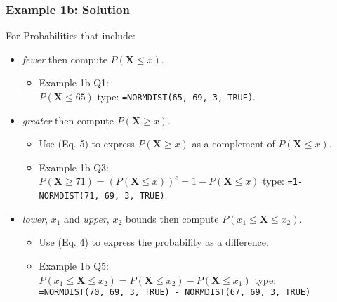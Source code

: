 \documentclass[12pt]{beamer}
\begin{document}
  	\begin{frame}
  		\frametitle{Example 1b: Solution}
  		For Probabilities that include:
  		\begin{itemize}
  			\item \textit{fewer} then compute $P(\textbf{X} \leq x)$.
  				\begin{itemize}
  					\item Example 1b Q1:\\ $P(\textbf{X} \leq 65) $ type: \texttt{=NORMDIST(65, 69, 3, TRUE)}.
  				\end{itemize} 
  			\item \textit{greater} then compute $P(\textbf{X} \geq x)$.  
  			\begin{itemize}
  				\item Use (Eq. 5) to express $P(\textbf{X} \geq x)$ as a complement of $P(\textbf{X}\leq x)$.
  				\item Example 1b Q3: \\$P( \textbf{X} \geq 71) = (P(\textbf{X} \leq x))^c = 1 - P(\textbf{X} \leq x) $ type: \texttt{=1-NORMDIST(71, 69, 3, TRUE)}.
  			\end{itemize}
  		
  			\item \textit{lower}, $x_1$ and  \textit{upper}, $x_2$ bounds then compute $P(x_1 \leq \textbf{X} \leq x_2)$.
  			\begin{itemize}
  				\item Use (Eq. 4) to express the probability as a difference. 
  				\item Example 1b Q5: \\
  				$P(x_1 \leq \textbf{X} \leq x_2) = P(\textbf{X} \leq x_2) - P(\textbf{X} \leq x_1)$ type:\\
  				\footnotesize{ 
  				\texttt{=NORMDIST(70, 69, 3, TRUE) - NORMDIST(67, 69, 3, TRUE)}
  			}
  			\end{itemize}
	\end{itemize}	
\end{frame}
\end{document}
